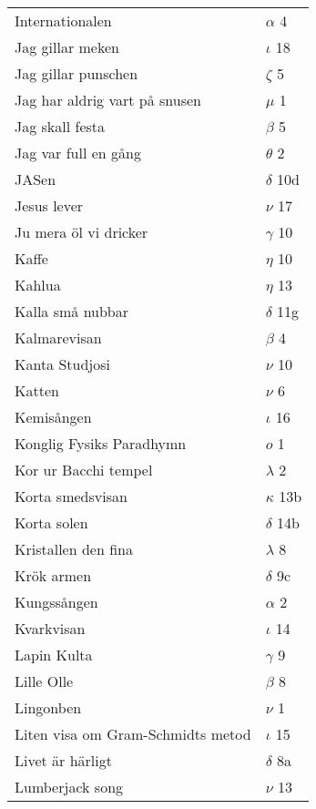 \documentclass[a6paper,10pt]{article}
\begin{document}
\newpage
\setlength{\oddsidemargin}{-0.47in}
\begin{table}[!h]
\begin{tabular}{l l}
Internationalen&$\alpha$ 4\\
Jag gillar meken&$\iota$ 18\\
Jag gillar punschen&$\zeta$ 5\\
Jag har aldrig vart på snusen&$\mu$ 1\\
Jag skall festa&$\beta$ 5\\
Jag var full en gång&$\theta$ 2\\
JASen&$\delta$ 10d\\
Jesus lever&$\nu$ 17\\
Ju mera öl vi dricker&$\gamma$ 10\\
Kaffe&$\eta$ 10\\
Kahlua&$\eta$ 13\\
Kalla små nubbar&$\delta$ 11g\\
Kalmarevisan&$\beta$ 4\\
Kanta Studjosi&$\nu$ 10\\
Katten&$\nu$ 6\\
Kemisången&$\iota$ 16\\
Konglig Fysiks Paradhymn&$o$ 1\\
Kor ur Bacchi tempel	&$\lambda$ 2\\
Korta smedsvisan&	$\kappa$ 13b\\
Korta solen	&$\delta$ 14b\\
Kristallen den fina&	$\lambda$ 8\\
Krök armen	&$\delta$ 9c\\
Kungssången&	$\alpha$ 2\\
Kvarkvisan	&$\iota$ 14\\
Lapin Kulta&$\gamma$ 9\\
Lille Olle	&$\beta$ 8\\
Lingonben	&$\nu$ 1\\
Liten visa om Gram-Schmidts metod	&$\iota$ 15\\
Livet är härligt&	$\delta$ 8a\\
Lumberjack song	&$\nu$ 13\\
\end{tabular}
\end{table}
\end{document}
